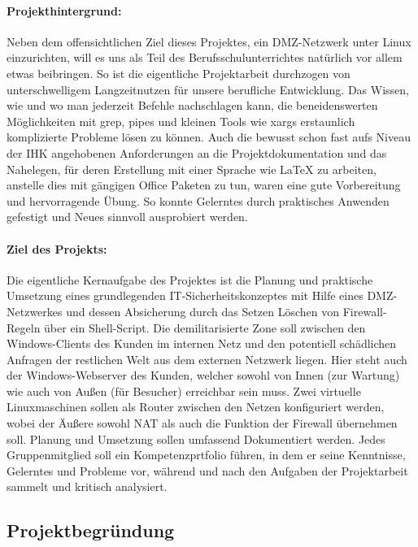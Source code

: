 \paragraph*{Projekthintergrund: } Neben dem offensichtlichen Ziel dieses Projektes, ein \ac{DMZ}-Netzwerk unter Linux einzurichten, will es uns als Teil des Berufsschulunterrichtes natürlich vor allem etwas beibringen. So ist die eigentliche Projektarbeit durchzogen von unterschwelligem Langzeitnutzen für unsere berufliche Entwicklung. Das Wissen, wie und wo man jederzeit Befehle nachschlagen kann, die beneidenswerten Möglichkeiten mit grep, pipes und kleinen Tools wie xargs erstaunlich komplizierte Probleme lösen zu können. Auch die bewusst schon fast aufs Niveau der \ac{IHK} angehobenen Anforderungen an die Projektdokumentation und das Nahelegen, für deren Erstellung mit einer Sprache wie \LaTeX{} zu arbeiten, anstelle dies mit gängigen Office Paketen zu tun, waren eine gute Vorbereitung und hervorragende Übung. So konnte Gelerntes durch praktisches Anwenden gefestigt und Neues sinnvoll ausprobiert werden. 
\paragraph*{Ziel des Projekts: } Die eigentliche Kernaufgabe des Projektes ist die Planung und praktische Umsetzung eines grundlegenden \ac{IT}-Sicherheitskonzeptes mit Hilfe eines \ac{DMZ}-Netzwerkes und dessen Absicherung durch das Setzen \bzw Löschen von Firewall-Regeln über ein Shell-Script. Die demilitarisierte Zone soll zwischen den Windows-Clients des Kunden im internen Netz und den potentiell schädlichen Anfragen der restlichen Welt aus dem externen Netzwerk liegen. Hier steht auch der Windows-Webserver des Kunden, welcher sowohl von Innen (zur Wartung) wie auch von Außen (für Besucher) erreichbar sein muss. Zwei virtuelle Linuxmaschinen sollen als Router zwischen den Netzen konfiguriert werden, wobei der Äußere sowohl \ac{NAT} als auch die Funktion der Firewall übernehmen soll. Planung und Umsetzung sollen umfassend Dokumentiert werden. Jedes Gruppenmitglied soll ein Kompetenzprtfolio führen, in dem er seine Kenntnisse, Gelerntes und Probleme vor, während und nach den Aufgaben der Projektarbeit sammelt und kritisch analysiert.

\subsection{Projektbegründung} 
\label{sec:Projektbegruendung}

